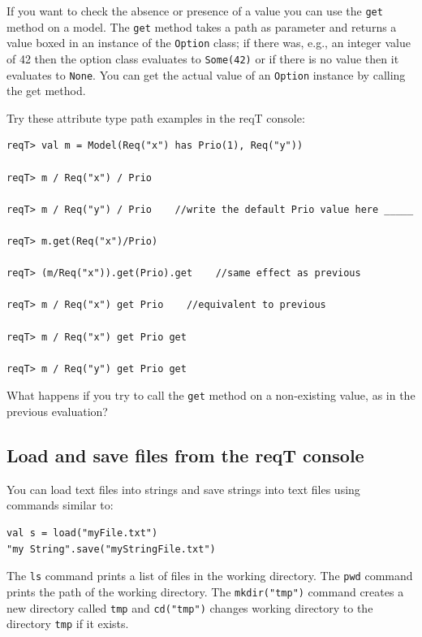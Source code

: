\documentclass[11pt]{article}
\begin{document}
If you want to check the absence or presence of a value you can use the \verb+get+ method on a model. The \verb+get+ method takes a path as parameter and returns a value boxed in an instance of the \verb+Option+ class; if there was, e.g.,  an integer value of 42 then the option class evaluates to \verb+Some(42)+ or if there is no value then it evaluates to \verb+None+. You can get the actual value of an \verb+Option+ instance by calling the get method.    

\begin{framed}\noindent
Try these attribute type path examples in the reqT console: 
{\scriptsize \begin{verbatim}
reqT> val m = Model(Req("x") has Prio(1), Req("y"))

reqT> m / Req("x") / Prio

reqT> m / Req("y") / Prio    //write the default Prio value here _____

reqT> m.get(Req("x")/Prio)

reqT> (m/Req("x")).get(Prio).get    //same effect as previous    

reqT> m / Req("x") get Prio    //equivalent to previous

reqT> m / Req("x") get Prio get    

reqT> m / Req("y") get Prio get    
\end{verbatim}}
\noindent What happens if you try to call the \verb+get+ method on a non-existing value, as in the previous evaluation?
\newline\newline\underline{\hspace{10cm}}
\end{framed}

\subsection{Load and save files from the reqT console}

You can load text files into strings and save strings into text files using commands similar to: 
\begin{verbatim}
val s = load("myFile.txt")
"my String".save("myStringFile.txt")
\end{verbatim}
The \verb+ls+ command prints a list of files in the working directory. The \verb+pwd+ command prints the path of the working directory. The \verb+mkdir("tmp")+ command creates a new directory called \verb+tmp+ and \verb+cd("tmp")+ changes working directory to the directory \verb+tmp+ if it exists.
\end{document}
